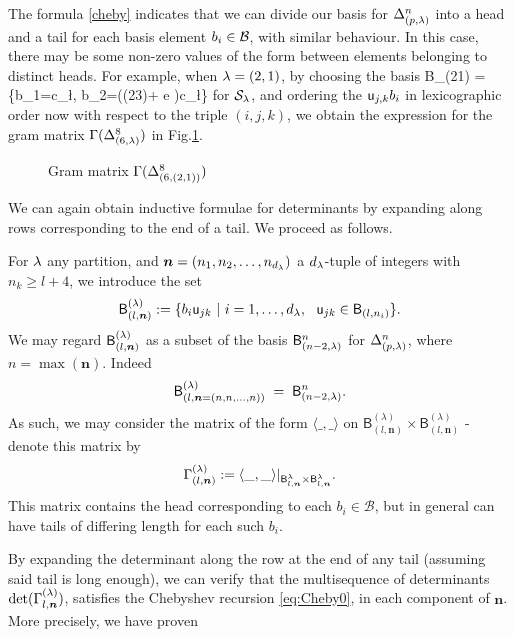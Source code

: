 The formula \eqref{cheby} indicates that we can divide our basis for $\Delta^{n}_{(p,\lambda)}$ into a head and a tail for each basis element $b_i \in \mathcal{B}$, with similar behaviour. 
In this case, there may be some non-zero values of the form between elements belonging to distinct heads. 
For example, when $\lambda=(2,1)$, by choosing the basis 
\beq   \label{eq:21ortho}
{\mathcal B}_{(21)} \; 
   = \;\;\{b_1=c_{\l}, \; b_2=((23)+ e )c_{\l}\}
\eq  
for $\mathcal{S}_\lambda$, and ordering the 
$ {\mathsf u}_{j,k} b_i$ 
in lexicographic order now with respect to the triple $(i,j,k)$, we obtain the %
expression for the gram matrix $\Gamma(\Delta^{8}_{(6,\lambda)})$ 
in Fig.\ref{fig:n9la21}.

\begin{figure} \vspace{-.43in} 

    \caption{Gram matrix  $\Gamma(\Delta^{8}_{(6,(2,1))}) $ 
    \label{fig:n9la21}}
\vspace{-.0251in} 
\end{figure}

\medskip  

\newcommand{\B}[2]{{\mathsf B}^{#1}_{#2}}

We can again obtain inductive formulae for determinants by expanding along rows corresponding to the end of a tail. We proceed as follows.

\mdef \label{par:bmn}
For $\lambda$ any partition, and $\bm{n}=(n_1,n_2,\dots,n_{d_{\lambda}})$ a $d_\lambda$-tuple of integers with $n_k \geq l+4$, we introduce the set 
\[
{\mathsf B}^{(\lambda)}_{(l,\bm{n})}:=
   \{ b_i {\mathsf u}_{jk} \ | \ i= 1,\dots, d_{\lambda}, \ \ {\mathsf u}_{jk}\in {\mathsf B}_{(l,n_i)}\}.
\]
We may regard ${\mathsf B}^{(\lambda)}_{(l,\bm{n})}$ as a subset of the basis ${\mathsf B}^{n}_{(n-2,\lambda)}$
for $\Delta^{n}_{(p,\lambda)}$, where $n=\max(\bm{n})$. Indeed 
\[
{\mathsf B}^{(\lambda)}_{(l,\bm{n}=(n,n,...,n))}   \;  = \;    {\mathsf B}^{n}_{(n-2,\lambda)}  
.\]
As such, we may consider the matrix of the form $\langle\_,\_\rangle$ on $ \B{(\lambda)}{(l,\bm{n})} \times \B{(\lambda)}{(l,\bm{n})}$
- denote this matrix by 
\[
\Gamma_{(l,\bm{n})}^{(\l)}   :=  
  \langle\_,\_\rangle|_{  \B{\lambda}{l,\bm{n}} \times \B{\lambda}{l,\bm{n}} }  . 
\] 
This matrix contains the head corresponding to each $b_i\in \mathcal{B}$, but in general can have tails of differing length for each such $b_i$. 

By expanding the determinant along the row at the end of any tail (assuming said tail is long enough), we can verify that the multisequence of determinants $\det(\Gamma_{l,\bm{n}}^{(\lambda)})$, satisfies the Chebyshev recursion \eqref{eq:Cheby0}, in each component of $\bm{n}$. More precisely, we have proven 


